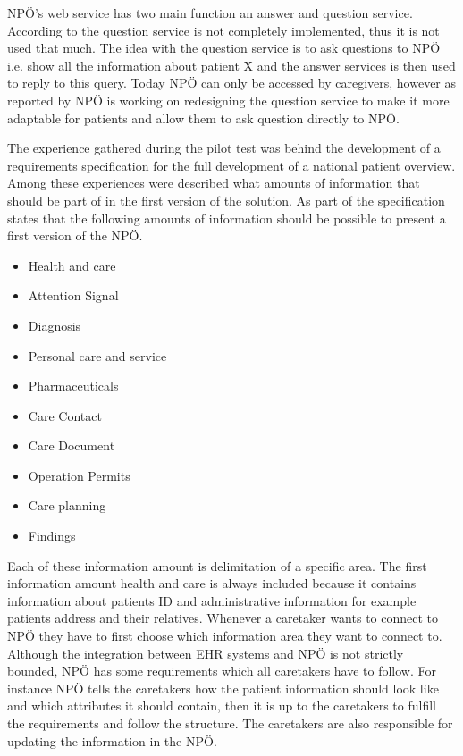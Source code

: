 \documentclass[14pt]{article}
\begin{document}
NPÖ's web service has two main function an answer and question service. According to \cite{ViktorJernelov} the question service is not completely implemented, thus it is not used that much. The idea with the question service is to ask questions to NPÖ i.e. show all the information about patient X and the answer services is then used to reply to this query. Today NPÖ can only be accessed by caregivers, however as reported by \cite{ViktorJernelov} NPÖ is working on redesigning the question service to make it more adaptable for patients and allow them to ask question directly to NPÖ. 

The experience gathered during the pilot test was behind the development of a requirements specification for the full development of a national patient overview. Among these experiences were described what amounts of information that should be part of in the first version of the solution. As part of the specification states that the following amounts of information should be possible to present a first version of the NPÖ.
\begin{itemize}
\item Health and care
\item Attention Signal
\item Diagnosis
\item Personal care and service
\item Pharmaceuticals
\item Care Contact
\item Care Document
\item Operation Permits
\item Care planning
\item Findings
\end{itemize}
Each of these information amount is delimitation of a specific area. The first information amount health and care is always included because it contains information about patients ID and administrative information for example patients address and their relatives. Whenever a caretaker wants to connect to NPÖ they have to first choose which information area they want to connect to. Although the integration between \gls{EHR} systems and NPÖ is not strictly bounded, NPÖ has some requirements which all caretakers have to follow. For instance NPÖ tells the caretakers how the patient information should look like and which attributes it should contain, then it is up to the caretakers to fulfill the requirements and follow the structure. The caretakers are also responsible for updating the information in the NPÖ. 
\end{document}
